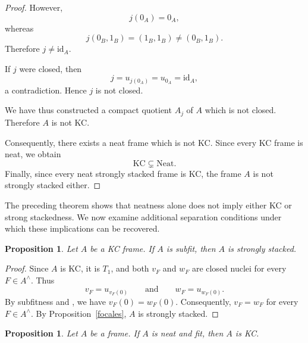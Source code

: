 \documentclass[11pt]{amsart}
\theoremstyle{plain}
\newtheorem{prop}[thm]{Proposition}
\theoremstyle{definition}
\begin{document}
\begin{proof}
However,
\[
j(0_A)=0_A,
\]
whereas
\[
j(0_B,1_B)=(1_B,1_B)\neq(0_B,1_B).
\]
Therefore $j\neq\mathrm{id}_A$.

If $j$ were closed, then
\[
j=u_{j(0_A)}=u_{0_A}=\mathrm{id}_A,
\]
a contradiction. Hence $j$ is not closed.

We have thus constructed a compact quotient
$A_j$ of $A$ which is not closed. Therefore
$A$ is not KC.

Consequently, there exists a neat frame which
is not KC. Since every KC frame is neat, we
obtain
\[
\mathrm{KC}\subsetneq\mathrm{Neat}.
\]
Finally, since every neat strongly stacked
frame is KC, the frame $A$ is not strongly
stacked either.
\end{proof}

The preceding theorem shows that neatness alone does not imply either KC 
or strong stackedness. We now examine additional separation conditions under 
which these implications can be recovered.

\begin{prop}\label{KCsfitSS}
Let $A$ be a KC frame. If $A$ is subfit, then $A$ is strongly
stacked.
\end{prop}


\begin{proof}
Since $A$ is KC, it is $T_1$, and both
$v_F$ and $w_F$ are closed nuclei for every
$F\in A^\wedge$. Thus
\[
v_F=u_{v_F(0)}
\qquad\text{and}\qquad
w_F=u_{w_F(0)}.
\]
By subfitness and \cite[Theorem 3.5]{simmons2006regularity},
we have $v_F(0)=w_F(0)$. Consequently,
$v_F=w_F$ for every $F\in A^\wedge$.
By Proposition~\ref{focales}, $A$ is strongly stacked.
\end{proof}

\begin{prop}\label{NeatfitKC}
Let \(A\) be a frame. If \(A\) is neat and fit, then \(A\) is KC.
\end{prop}
\end{document}
